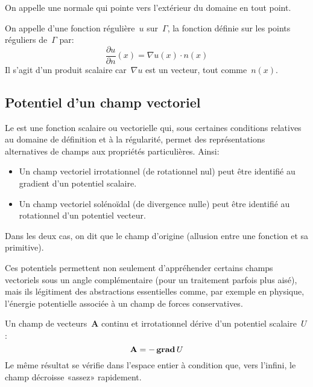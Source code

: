 \medskip
On appelle  une normale qui pointe vers l'extérieur du domaine en tout point.

\medskip
\begin{definition}
On appelle  d'une fonction régulière~$u$ sur~$\Gamma$, la fonction définie sur les points réguliers de~$\Gamma$ par:
\begin{equation}\dfrac{\partial u}{\partial n}(x)=\nabla u(x)\cdot n(x)\end{equation}
Il s'agit d'un produit scalaire car~$\nabla u$ est un vecteur, tout comme~$n(x)$.
\end{definition}

\medskip
\subsection{Potentiel d'un champ vectoriel}

Le  est une fonction scalaire ou vectorielle qui, sous certaines conditions relatives au domaine de définition et à la régularité, permet des représentations alternatives de champs aux propriétés particulières. Ainsi:
\begin{itemize}
  \item Un champ vectoriel irrotationnel (de rotationnel nul) peut être identifié au gradient d'un potentiel scalaire.
  \item Un champ vectoriel solénoïdal (de divergence nulle) peut être identifié au rotationnel d'un potentiel vecteur.
\end{itemize}
Dans les deux cas, on dit que le champ d'origine  (allusion entre une fonction et sa primitive).

\medskip
Ces potentiels permettent non seulement d'appréhender certains champs vectoriels sous un angle complémentaire (pour un traitement parfois plus aisé), mais ils légitiment des abstractions essentielles comme, par exemple en physique, l'énergie potentielle associée à un champ de forces conservatives.

\medskip
Un champ de vecteurs~$\mathbf{A}$ continu et irrotationnel dérive d'un potentiel scalaire~$U$:
\begin{equation}
 \mathbf{A} = -\operatorname{\mathbf{grad}} U
\end{equation}
Le même résultat se vérifie dans l'espace entier à condition que, vers l'infini, le champ décroisse «assez» rapidement.

